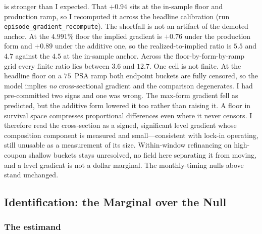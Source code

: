 \documentclass[12pt]{article}
\begin{document}
is stronger than I expected. That $+0.94$ sits at the in-sample floor and production ramp, so I recomputed it across the headline calibration (run \texttt{episode\_gradient\_recompute}). The shortfall is not an artifact of the demoted anchor. At the $4.991\%$ floor the implied gradient is $+0.76$ under the production form and $+0.89$ under the additive one, so the realized-to-implied ratio is $5.5$ and $4.7$ against the $4.5$ at the in-sample anchor. Across the floor-by-form-by-ramp grid every finite ratio lies between $3.6$ and $12.7$. One cell is not finite. At the headline floor on a $75$~PSA ramp both endpoint buckets are fully censored, so the model implies \emph{no} cross-sectional gradient and the comparison degenerates. I had pre-committed two signs and one was wrong. The max-form gradient fell as predicted, but the additive form lowered it too rather than raising it. A floor in survival space compresses proportional differences even where it never censors. I therefore read the cross-section as a signed, significant level gradient whose composition component is measured and small---consistent with lock-in operating, still unusable as a measurement of its size. Within-window refinancing on high-coupon shallow buckets stays unresolved, no field here separating it from moving, and a level gradient is not a dollar marginal. The monthly-timing nulls above stand unchanged.
\subsection{Identification: the Marginal over the Null}\label{sec:identification}

\subsubsection{The estimand}
\end{document}
